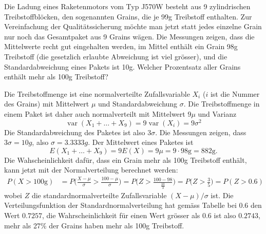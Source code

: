 Die Ladung eines Raketenmotors vom Typ J570W besteht aus 9 zylindrischen
Treibstoffblöcken, den sogenannten Grains,
die je 99g Treibstoff enthalten. Zur Vereinfachung der Qualitätssicherung
möchte man jetzt statt jedes einzelne Grain nur noch das Gesamtpaket
aus 9 Grains
wägen. Die Messungen zeigen, dass die Mittelwerte recht gut eingehalten
werden, im Mittel enthält ein Grain 98g Treibstoff (die gesetzlich erlaubte
Abweichung ist viel grösser), und die Standardabweichung eines Pakets
ist 10g. Welcher Prozentsatz aller Grains enthält mehr als 100g Treibstoff?


\begin{loesung}
Die Treibstoffmenge ist eine normalverteilte Zufallsvariable $X_i$
($i$ ist die Nummer des Grains)
mit Mittelwert $\mu$ und
Standardabweichung $\sigma$. Die Treibstoffmenge in einem
Paket ist daher auch normalverteilt mit Mittelwert $9\mu$ und
Varianz
\[
\operatorname{var}(X_1+\dots+X_9)=9\operatorname{var}(X_i)=9\sigma^2
\]
Die Standardabweichung des Paketes ist also $3\sigma$. Die Messungen
zeigen, dass $3\sigma=10g$, also $\sigma=3.3333g$. Der Mittelwert
eines Paketes ist
\[
E(X_1+\dots+X_9)=9E(X)=9\mu=9\cdot 98\text{g} = 882\text{g}.
\]
Die Wahscheinlichkeit dafür, dass ein Grain mehr als 100g Treibstoff
enthält, kann jetzt mit der Normalverteilung berechnet werden:
\begin{align*}
P(X>100\text{g})
&=
P\biggl(\frac{X-\mu}{\sigma}>\frac{100-\mu}{\sigma}\biggr)
=
P\biggl(Z>\frac{100-98}{\frac{10}{3}}\biggr)
=
P\biggl(Z>\frac{3}{5}\biggr)
=
P(Z > 0.6)
\end{align*}
wobei $Z$ die standardnormalverteilte Zufallsvariable $(X-\mu)/\sigma$ ist.
Die
Verteilungsfunktion der Standardnormalverteilung hat gemäss
Tabelle bei $0.6$
den Wert $0.7257$, die Wahrscheinlichkeit für einen Wert grösser
als $0.6$ ist also $0.2743$, mehr als 27\% der Grains haben mehr
als 100g Treibstoff.
\end{loesung}


